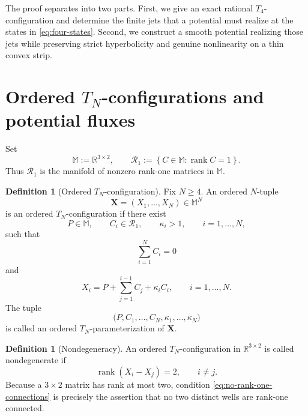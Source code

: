 \documentclass[11pt,reqno]{amsart}
\theoremstyle{definition}
\newtheorem{definition}[theorem]{Definition}
\DeclareMathOperator{\rank}{rank}
\newcommand{\R}{\mathbb{R}}
\newcommand{\M}{\mathbb{M}}
\newcommand{\set}[1]{\left\{#1\right\}}
\begin{document}
The proof separates into two parts.  First, we give an exact rational
$T_4$-configuration and determine the finite jets that a potential must
realize at the states in \cref{eq:four-states}.  Second, we construct a smooth
potential realizing those jets while preserving strict hyperbolicity and
genuine nonlinearity on a thin convex strip.

\section{Ordered \texorpdfstring{$T_N$}{TN}-configurations and potential fluxes}

Set
\begin{equation}
  \M:=\R^{3\times2},
  \qquad
  \mathcal R_1:=\set{C\in\M:\rank C=1}.
\end{equation}
Thus $\mathcal R_1$ is the manifold of nonzero rank-one matrices in $\M$.

\begin{definition}[Ordered $T_N$-configuration]
  \label{def:TN}
Fix $N\ge4$.  An ordered $N$-tuple
\begin{equation}
  \mathbf X=(X_1,\ldots,X_N)\in\M^N
\end{equation}
is an ordered $T_N$-configuration if there exist
\begin{equation}
  P\in\M,
  \qquad C_i\in\mathcal R_1,
  \qquad \kappa_i>1,
  \qquad i=1,\ldots,N,
  \label{eq:TN-parameters}
\end{equation}
such that
\begin{equation}
  \sum_{i=1}^N C_i=0
  \label{eq:TN-closure}
\end{equation}
and
\begin{equation}
  X_i=P+\sum_{j=1}^{i-1}C_j+\kappa_iC_i,
  \qquad i=1,\ldots,N.
  \label{eq:TN-parametrization}
\end{equation}
The tuple
\begin{equation}
  \bigl(P,C_1,\ldots,C_N,\kappa_1,\ldots,\kappa_N\bigr)
\end{equation}
is called an ordered $T_N$-parameterization of $\mathbf X$.
\end{definition}

\begin{definition}[Nondegeneracy]
  \label{def:nondegenerate}
An ordered $T_N$-configuration in $\R^{3\times2}$ is called nondegenerate if
\begin{equation}
  \rank(X_i-X_j)=2,
  \qquad i\neq j.
  \label{eq:no-rank-one-connections}
\end{equation}
Because a $3\times2$ matrix has rank at most two, condition
\cref{eq:no-rank-one-connections} is precisely the assertion that no two
distinct wells are rank-one connected.
\end{definition}
\end{document}
